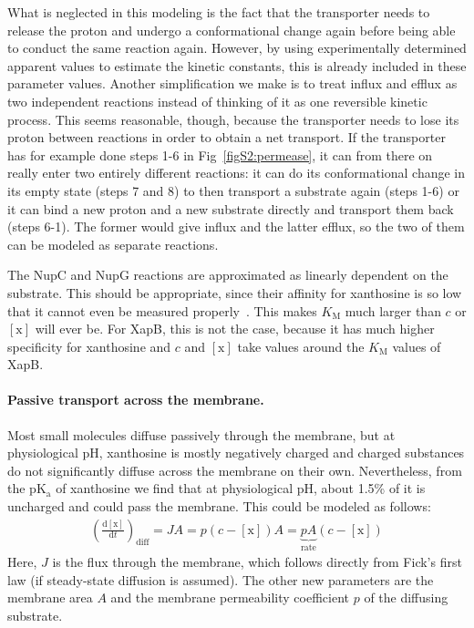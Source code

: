\documentclass[10pt,letterpaper]{article}
\newcommand{\n}[1]{\mathrm{#1}}
\newcommand{\dd}[2]{\frac{\mathrm{d} #1}{\mathrm{d} #2}}
\begin{document}
What is neglected in this modeling is the fact that the transporter needs to
release the proton and undergo a conformational change again before being
able to conduct the same reaction again. However, by using experimentally
determined apparent values to estimate the kinetic constants, this is
already included in these parameter values. Another simplification we make
is to treat influx and efflux as two independent reactions instead of
thinking of it as one reversible kinetic process. This seems reasonable,
though, because the transporter needs to lose its proton between reactions
in order to obtain a net transport. If the transporter has for example done
steps 1-6 in Fig~\ref{figS2:permease}, it can from there on really enter two
entirely different reactions: it can do its conformational change in its
empty state (steps 7 and 8) to then transport a substrate again (steps 1-6)
or it can bind a new proton and a new substrate directly and transport them
back (steps 6-1). The former would give influx and the latter efflux, so the
two of them can be modeled as separate reactions.

The NupC and NupG reactions are approximated as linearly dependent on the
substrate. This should be appropriate, since their affinity for xanthosine
is so low that it cannot even be measured properly~\cite{Norholm2001}. This
makes $K_{\n{M}}$ much larger than $c$ or $\n{[x]}$ will ever be. For XapB,
this is not the case, because it has much higher specificity for xanthosine
and $c$ and $\n{[x]}$ take values around the $K_{\n{M}}$ values of XapB.

\paragraph*{Passive transport across the membrane.}  
Most small molecules diffuse passively through the membrane, but at
physiological pH, xanthosine is mostly negatively charged and charged
substances do not significantly diffuse across the membrane on their own.
Nevertheless, from the $\n{pK_a}$ of xanthosine we find that at
physiological pH, about 1.5\% of it is uncharged and could pass the
membrane. This could be modeled as follows:
\begin{eqnarray}
\label{eq:diff}
\left(\dd{\n{[x]}}{t}\right)_{\n{diff}} = J A = p (c-\n{[x]}) A = \underbrace{p A}_{\n{rate}} (c-\n{[x]})
\end{eqnarray}
Here, $J$ is the flux through the membrane, which follows directly from
Fick's first law (if steady-state diffusion is assumed). The other new
parameters are the membrane area $A$ and the membrane permeability
coefficient $p$ of the diffusing substrate.
\end{document}
